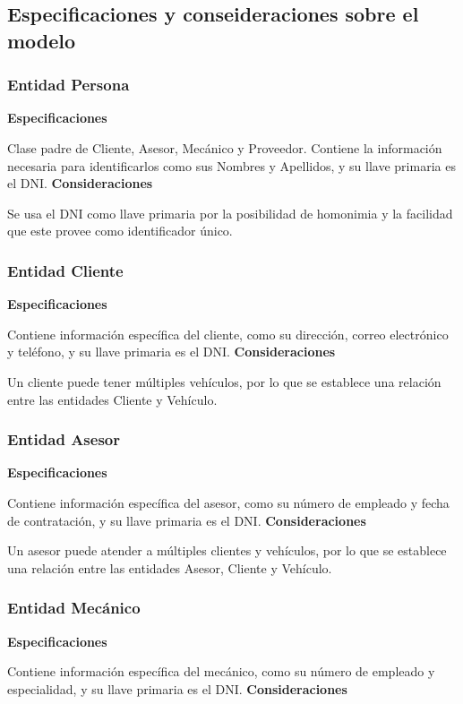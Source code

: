 \documentclass[12pt]{article}
\begin{document}
\subsection{Especificaciones y conseideraciones sobre el modelo}

\subsubsection{Entidad Persona}
\textbf{Especificaciones}

Clase padre de Cliente, Asesor, Mecánico y Proveedor. Contiene la información necesaria para identificarlos como sus Nombres y Apellidos, y su llave primaria es el DNI.
\textbf{Consideraciones}

Se usa el DNI como llave primaria por la posibilidad de homonimia y la facilidad que este provee como identificador único.

\subsubsection{Entidad Cliente}
\textbf{Especificaciones}

Contiene información específica del cliente, como su dirección, correo electrónico y teléfono, y su llave primaria es el DNI.
\textbf{Consideraciones}

Un cliente puede tener múltiples vehículos, por lo que se establece una relación entre las entidades Cliente y Vehículo.

\subsubsection{Entidad Asesor}
\textbf{Especificaciones}

Contiene información específica del asesor, como su número de empleado y fecha de contratación, y su llave primaria es el DNI.
\textbf{Consideraciones}

Un asesor puede atender a múltiples clientes y vehículos, por lo que se establece una relación entre las entidades Asesor, Cliente y Vehículo.

\subsubsection{Entidad Mecánico}
\textbf{Especificaciones}

Contiene información específica del mecánico, como su número de empleado y especialidad, y su llave primaria es el DNI.
\textbf{Consideraciones}
\end{document}

